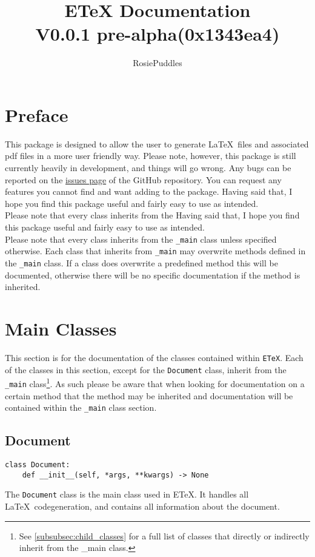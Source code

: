 \documentclass{article}
\title{ETeX Documentation\\\large V0.0.1 pre-alpha(0x1343ea4)}
\date{}
\author{RosiePuddles}
\begin{document}
\maketitle
\tableofcontents
\newpage

\section{Preface}\label{sec:preface}
This package is designed to allow the user to generate \LaTeX\ files and associated pdf files in a more user friendly way. Please note, however, this package is still currently heavily in development, and things will go wrong. Any bugs can be reported on the \href{https://github.com/RosiePuddles/ETeX\_from\_python/issues}{issues page} of the GitHub repository. You can request any features you cannot find and want adding to the package. Having said that, I hope you find this package useful and fairly easy to use as intended.\\
Please note that every class inherits from the  Having said that, I hope you find this package useful and fairly easy to use as intended.\\
Please note that every class inherits from the \verb|_main| class unless specified otherwise. Each class that inherits from \verb|_main| may overwrite methods defined in the \verb|_main| class. If a class does overwrite a predefined method this will be documented, otherwise there will be no specific documentation if the method is inherited.
\section{Main Classes}\label{sec:main_classes}
This section is for the documentation of the classes contained within \verb|ETeX|. Each of the classes in this section, except for the \verb|Document| class, inherit from the \verb|_main| class\footnote{See \autoref{subsubsec:child_classes} for a full list of classes that directly or indirectly inherit from the \_main class.}. As such please be aware that when looking for documentation on a certain method that the method may be inherited and documentation will be contained within the \verb|_main| class section.
\subsection{Document}\label{subsec:document}
\begin{verbatim}
class Document:
	def __init__(self, *args, **kwargs) -> None
\end{verbatim}
The \verb|Document| class is the main class used in ETeX. It handles all \LaTeX\ codegeneration, and contains all information about the document.
\end{document}
